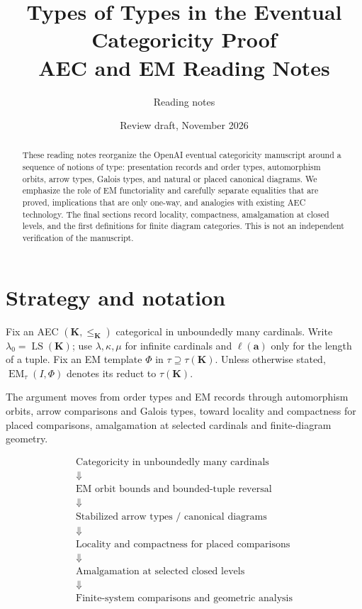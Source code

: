 \documentclass[11pt]{article}
\title{Types of Types in the Eventual Categoricity Proof\\\large AEC and EM Reading Notes}
\author{Reading notes}
\date{Review draft, November 2026}
\newcommand{\K}{\mathbf K}
\newcommand{\LS}{\operatorname{LS}}
\newcommand{\EM}{\operatorname{EM}_{\tau}}
\newcommand{\ba}{\mathbf{a}}
\theoremstyle{plain}
\begin{document}
\maketitle
\begin{abstract}
These reading notes reorganize the OpenAI eventual categoricity
manuscript around a sequence of notions of type: presentation
records and order types, automorphism orbits, arrow types, Galois
types, and natural or placed canonical diagrams. We emphasize the
role of EM functoriality and carefully separate equalities that
are proved, implications that are only one-way, and analogies
with existing AEC technology. The final sections record locality,
compactness, amalgamation at closed levels, and the first
definitions for finite diagram categories. This is not an independent
verification of the manuscript.
\end{abstract}
\tableofcontents
\section{Strategy and notation}
Fix an AEC $(\K,\leq_\K)$ categorical in unboundedly many cardinals.
Write $\lambda_0=\LS(\K)$; use $\lambda,\kappa,\mu$ for infinite
cardinals and $\ell(\ba)$ only for the length of a tuple.
Fix an EM template $\Phi$ in $\tau\supseteq\tau(\K)$.
Unless otherwise stated, $\EM(I,\Phi)$ denotes its reduct
to $\tau(\K)$.

The argument moves from order types and EM records through
automorphism orbits, arrow comparisons and Galois types,
toward locality and compactness for placed comparisons,
amalgamation at selected cardinals and finite-diagram geometry.

\[
\begin{array}{c}
\text{Categoricity in unboundedly many cardinals}\\[3pt]
\Downarrow\\[3pt]
\text{EM orbit bounds and bounded-tuple reversal}\\[3pt]
\Downarrow\\[3pt]
\text{Stabilized arrow types / canonical diagrams}\\[3pt]
\Downarrow\\[3pt]
\text{Locality and compactness for placed comparisons}\\[3pt]
\Downarrow\\[3pt]
\text{Amalgamation at selected closed levels}\\[3pt]
\Downarrow\\[3pt]
\text{Finite-system comparisons and geometric analysis}
\end{array}
\]
\end{document}
